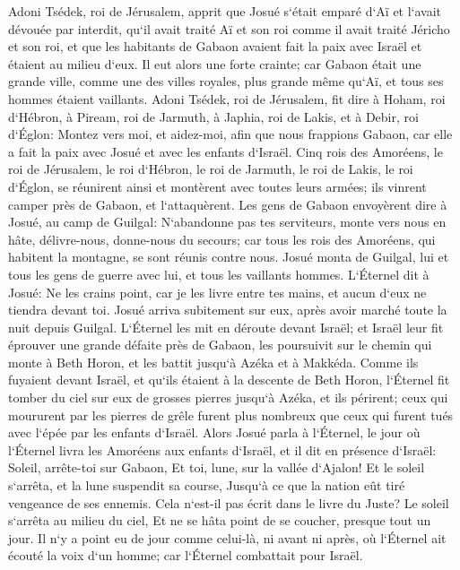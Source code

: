 \verse Adoni Tsédek, roi de Jérusalem, apprit que Josué s`était emparé d`Aï et l`avait dévouée par interdit, qu`il avait traité Aï et son roi comme il avait traité Jéricho et son roi, et que les habitants de Gabaon avaient fait la paix avec Israël et étaient au milieu d`eux. 
\verse Il eut alors une forte crainte; car Gabaon était une grande ville, comme une des villes royales, plus grande même qu`Aï, et tous ses hommes étaient vaillants. 
\verse Adoni Tsédek, roi de Jérusalem, fit dire à Hoham, roi d`Hébron, à Piream, roi de Jarmuth, à Japhia, roi de Lakis, et à Debir, roi d`Églon: 
\verse Montez vers moi, et aidez-moi, afin que nous frappions Gabaon, car elle a fait la paix avec Josué et avec les enfants d`Israël. 
\verse Cinq rois des Amoréens, le roi de Jérusalem, le roi d`Hébron, le roi de Jarmuth, le roi de Lakis, le roi d`Églon, se réunirent ainsi et montèrent avec toutes leurs armées; ils vinrent camper près de Gabaon, et l`attaquèrent. 
\verse Les gens de Gabaon envoyèrent dire à Josué, au camp de Guilgal: N`abandonne pas tes serviteurs, monte vers nous en hâte, délivre-nous, donne-nous du secours; car tous les rois des Amoréens, qui habitent la montagne, se sont réunis contre nous. 
\verse Josué monta de Guilgal, lui et tous les gens de guerre avec lui, et tous les vaillants hommes. 
\verse L`Éternel dit à Josué: Ne les crains point, car je les livre entre tes mains, et aucun d`eux ne tiendra devant toi. 
\verse Josué arriva subitement sur eux, après avoir marché toute la nuit depuis Guilgal. 
\verse L`Éternel les mit en déroute devant Israël; et Israël leur fit éprouver une grande défaite près de Gabaon, les poursuivit sur le chemin qui monte à Beth Horon, et les battit jusqu`à Azéka et à Makkéda. 
\verse Comme ils fuyaient devant Israël, et qu`ils étaient à la descente de Beth Horon, l`Éternel fit tomber du ciel sur eux de grosses pierres jusqu`à Azéka, et ils périrent; ceux qui moururent par les pierres de grêle furent plus nombreux que ceux qui furent tués avec l`épée par les enfants d`Israël. 
\verse Alors Josué parla à l`Éternel, le jour où l`Éternel livra les Amoréens aux enfants d`Israël, et il dit en présence d`Israël: Soleil, arrête-toi sur Gabaon, Et toi, lune, sur la vallée d`Ajalon! 
\verse Et le soleil s`arrêta, et la lune suspendit sa course, Jusqu`à ce que la nation eût tiré vengeance de ses ennemis. Cela n`est-il pas écrit dans le livre du Juste? Le soleil s`arrêta au milieu du ciel, Et ne se hâta point de se coucher, presque tout un jour. 
\verse Il n`y a point eu de jour comme celui-là, ni avant ni après, où l`Éternel ait écouté la voix d`un homme; car l`Éternel combattait pour Israël. 
